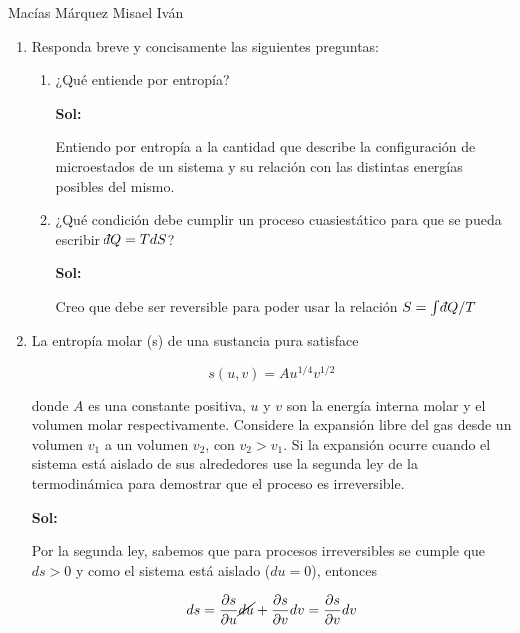 \documentclass[12pt,a4paper]{article}
\newcommand{\dbar}{\mathchar'26\mkern-12mu d}
\begin{document}
Macías Márquez Misael Iván

\begin{enumerate}






\item Responda breve y concisamente las siguientes preguntas:

\begin{enumerate}
    \item  ¿Qué entiende por entropía?
    
    \textbf{Sol:}
    
    Entiendo por entropía a la cantidad que describe la configuración de microestados de un sistema y su relación con las distintas energías posibles del mismo.
    
    
    
    \item ¿Qué condición debe cumplir un proceso cuasiestático para que se pueda escribir $\dbar Q = T dS$?
    
    \textbf{Sol:}
    
    Creo que debe ser reversible para poder usar la relación $S = \int \dbar Q/T$
\end{enumerate}






\item La entropía molar (s) de una sustancia pura satisface

\begin{equation*}
    s(u,v) = A u^{1/4}v^{1/2}
\end{equation*}

donde $A$ es una constante positiva, $u$ y $v$ son la energía interna molar y el volumen molar respectivamente. Considere la expansión libre del gas desde un volumen $v_1$ a un volumen $v_2$, con $v_2 > v_1$. Si la expansión ocurre cuando el sistema está aislado de sus alrededores use la segunda ley de la termodinámica para demostrar que el proceso es irreversible.

\textbf{Sol:}

Por la segunda ley, sabemos que para procesos irreversibles se cumple que $ds > 0$ y como el sistema está aislado ($du = 0$), entonces

\begin{equation*}
    ds = \frac{\partial s}{\partial u} \cancel{du} + \frac{\partial s}{\partial v} dv = \frac{\partial s}{\partial v} dv 
\end{equation*}


\end{enumerate}
\end{document}
